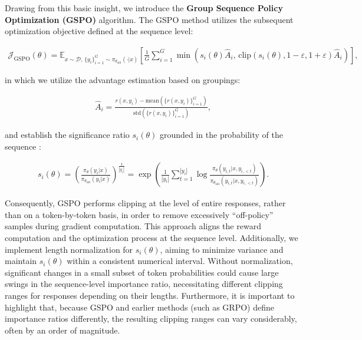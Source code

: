 Drawing from this basic insight, we introduce the \textbf{Group Sequence Policy Optimization (GSPO)} algorithm. The GSPO method utilizes the subsequent optimization objective defined at the sequence level:

\begin{align}
\mathcal{J}_\text{GSPO} (\theta) =
\mathbb{E}_{ x \sim \mathcal{D},\, \{y_i\}_{i=1}^G \sim \pi_{\theta_\text{old}}( \cdot | x) }
\left[ 
\frac{1}{G} \sum_{i=1}^{G}
\min \left( s_{i}(\theta)  \widehat{A}_{i},  \, \mathrm{clip} \left( s_{i}(\theta), 1 - {\varepsilon}, 1 + {\varepsilon} \right) \widehat{A}_{i} \right) 
\right],
\label{equ:gspo}
\end{align}

in which we utilize the advantage estimation based on groupings:

\begin{align}
\widehat{A}_{i} = \frac{r(x, y_i) - \mathrm{mean} \left( \{ r(x, y_i) \}_{i=1}^G \right) }{ \mathrm{std} \left( \{ r(x, y_i) \}_{i=1}^G \right) },
\end{align}

and establish the significance ratio $s_{i}(\theta)$ grounded in the probability of the sequence \citep{click}:

\begin{align}
s_{i}(\theta) = \left( \frac{ \pi_{\theta} (y_i | x) }{ \pi_{\theta_\text{old}} (y_i | x)} \right)^{\frac{1}{|y_i|}}
=
\exp \left( \frac{1}{|y_i|} \sum_{t=1}^{|y_i|} \log \frac{ \pi_{\theta} (y_{i,t} | x, y_{i,<t}) }{ \pi_{\theta_\text{old}} (y_{i,t} | x,y_{i,<t})} \right).
\end{align}

Consequently, GSPO performs clipping at the level of entire responses, rather than on a token-by-token basis, in order to remove excessively ``off-policy'' samples during gradient computation. This approach aligns the reward computation and the optimization process at the sequence level. Additionally, we implement length normalization for $s_{i}(\theta)$, aiming to minimize variance and maintain $s_{i}(\theta)$ within a consistent numerical interval. Without normalization, significant changes in a small subset of token probabilities could cause large swings in the sequence-level importance ratio, necessitating different clipping ranges for responses depending on their lengths. Furthermore, it is important to highlight that, because GSPO and earlier methods (such as GRPO) define importance ratios differently, the resulting clipping ranges can vary considerably, often by an order of magnitude.

